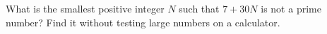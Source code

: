 What is the smallest positive integer $N$ such that $7+30N$ is not a prime number? Find it without testing large numbers on a calculator.
